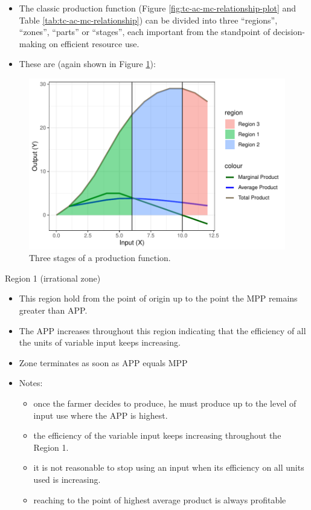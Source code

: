 \documentclass[12pt,ignorenonframetext,aspectratio=169]{beamer}
\providecommand{\tightlist}{%
  \setlength{\itemsep}{0pt}\setlength{\parskip}{0pt}}
\begin{document}
\begin{frame}{}
\protect\hypertarget{section-12}{}
\begin{itemize}
\tightlist
\item
  The classic production function (Figure
  \ref{fig:tc-ac-mc-relationship-plot} and Table
  \ref{tab:tc-ac-mc-relationship}) can be divided into three
  ``regions'', ``zones'', ``parts'' or ``stages'', each important from
  the standpoint of decision-making on efficient resource use.
\item
  These are (again shown in Figure
  \ref{fig:production-function-stages}):
\end{itemize}

\begin{figure}
\includegraphics[width=0.7\linewidth]{04-production_function_files/figure-beamer/production-function-stages-1} \caption{Three stages of a production function.}\label{fig:production-function-stages}
\end{figure}
\end{frame}

\begin{frame}{Region 1 (irrational zone)}
\protect\hypertarget{region-1-irrational-zone}{}
\begin{itemize}
\tightlist
\item
  This region hold from the point of origin up to the point the MPP
  remains greater than APP.
\item
  The APP increases throughout this region indicating that the
  efficiency of all the units of variable input keeps increasing.
\item
  Zone terminates as soon as APP equals MPP
\item
  Notes:

  \begin{itemize}
  \tightlist
  \item
    once the farmer decides to produce, he must produce up to the level
    of input use where the APP is highest.
  \item
    the efficiency of the variable input keeps increasing throughout the
    Region 1.
  \item
    it is not reasonable to stop using an input when its efficiency on
    all units used is increasing.
  \item
    reaching to the point of highest average product is always
    profitable
  \end{itemize}
\end{itemize}
\end{frame}
\end{document}
